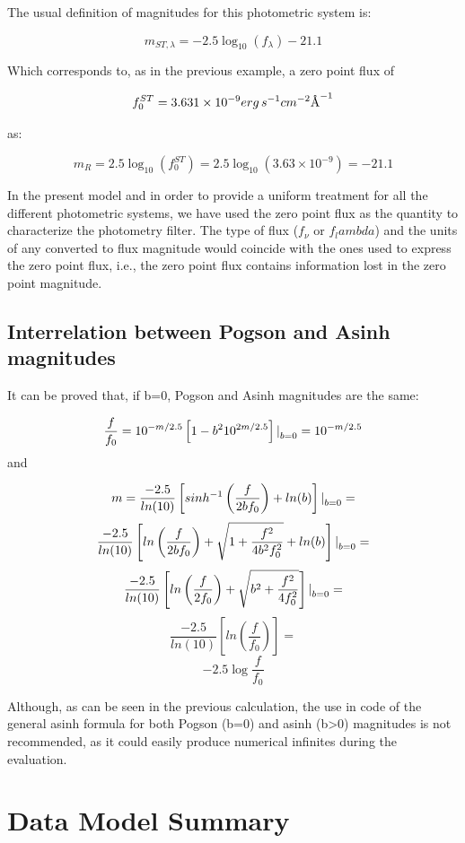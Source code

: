 \documentclass[11pt,a4paper]{ivoa}
\newcommand{\angstrom}{\mbox{\normalfont\AA}}
\begin{document}
\begin{appendices}
The usual definition of magnitudes for this photometric system is:
\par
\[
m_{ST,\lambda }=-2.5\log_{10} (f_\lambda )-21.1
\]

Which corresponds to, as in the previous example, a zero point flux of
\par
\[
f_0 ^{ST}=3.631 \times 10^{-9} erg\, s^{-1} cm^{-2} \angstrom ^{-1}
\]

as:
\par
\[
m_R =2.5\log_{10} (f_0 ^{ST})=2.5\log_{10} (3.63\times 10^{-9})=-21.1
\]

In the present model and in order to provide a uniform treatment for all the different photometric systems, we have used the zero point flux as the quantity to characterize the photometry filter. The type of flux ($f_\nu $ or $f_lambda $) and the units of any converted to flux magnitude would coincide with the ones used to express the zero point flux, i.e., the zero point flux contains information lost in the zero point magnitude.
\par

\subsection{Interrelation between Pogson and Asinh magnitudes}
It can be proved that, if b=0, Pogson and Asinh magnitudes are the same:\par
\[
\frac{f}{f_0}=10^{-m/2.5}\left[ 1-b^2 10^{2m/2.5}\right] \text{\textbar}_{b=0} =10^{-m/2.5}
\]
and\par
\[
m=\frac{-2.5}{ln(10)}\left[ sinh^{-1} \left(\frac{f}{2bf_0}\right) + ln(b)\right] \text{\textbar}_{b=0} =
\]
\[
\frac{-2.5}{ln(10)}\left[ ln\left(\frac{f}{2bf_0}\right) + \sqrt{1+\frac{f^2}{4b^2 f_0^2}} + ln(b)\right] \text{\textbar}_{b=0} =
\]
\[
\frac{-2.5}{ln(10)}\left[ ln\left(\frac{f}{2f_0}\right) + \sqrt{b^2+\frac{f^2}{4 f_0^2}}\right] \text{\textbar}_{b=0} =
\]
\[
\frac{-2.5}{ln(10)}\left[ ln(\frac{f}{f_0}) \right] =
\]
\[
-2.5\log{\frac{f}{f_0}}
\]


Although, as can be seen in the previous calculation, the use in code of the general asinh formula for both Pogson (b=0) and asinh (b>0) magnitudes is not recommended, as it could easily produce numerical infinites during the evaluation.
\par


\section{Data Model Summary}



\end{appendices}
\end{document}
